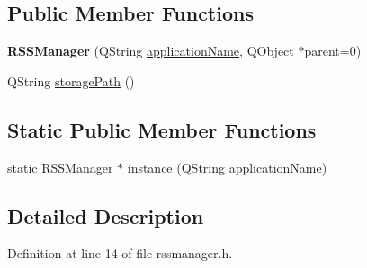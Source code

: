 \subsection*{Public Member Functions}
\begin{DoxyCompactItemize}
\item 
\hypertarget{class_r_s_s_manager_a6e38d3864a92ba3bb9989dacfb0a3f61}{{\bfseries R\-S\-S\-Manager} (Q\-String \hyperlink{class_r_s_s_manager_afe064ca0fb955f5a5a9874a7a4d273b1}{application\-Name}, Q\-Object $\ast$parent=0)}\label{class_r_s_s_manager_a6e38d3864a92ba3bb9989dacfb0a3f61}

\item 
Q\-String \hyperlink{class_r_s_s_manager_a6b15afc171af4ed4a51aa67f599edb40}{storage\-Path} ()
\end{DoxyCompactItemize}
\subsection*{Static Public Member Functions}
\begin{DoxyCompactItemize}
\item 
static \hyperlink{class_r_s_s_manager}{R\-S\-S\-Manager} $\ast$ \hyperlink{class_r_s_s_manager_a66085abae9b82a2292c162c76532b28d}{instance} (Q\-String \hyperlink{class_r_s_s_manager_afe064ca0fb955f5a5a9874a7a4d273b1}{application\-Name})
\end{DoxyCompactItemize}


\subsection{Detailed Description}


Definition at line 14 of file rssmanager.\-h.




